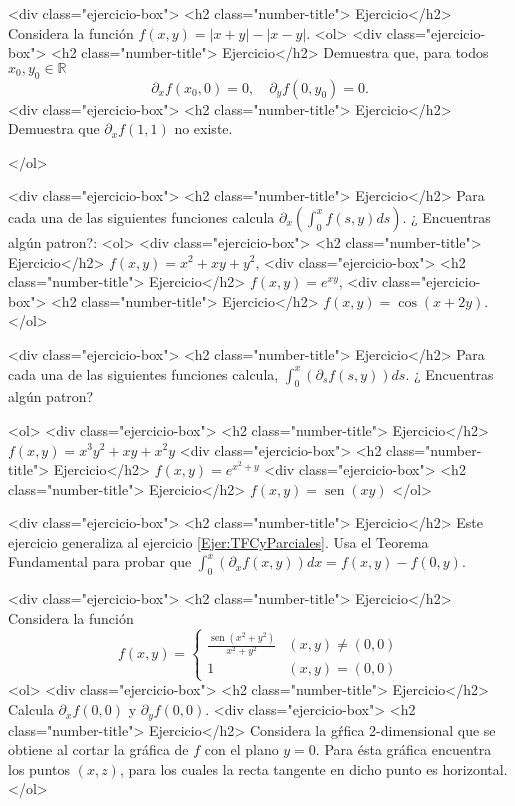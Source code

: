 \documentclass{article}
\theoremstyle{definition}
\newcommand{\sen}{\operatorname{sen}}
\begin{document}
       

     <div class="ejercicio-box"> <h2 class="number-title"> Ejercicio</h2> Considera la función $f(x,y)=|x+y|-|x-y|$.
       <ol>
       <div class="ejercicio-box"> <h2 class="number-title"> Ejercicio</h2> Demuestra que, para todos $x_0,y_0\in \mathbb{R}$
         $$
         \partial_xf(x_0,0)=0, \quad \partial_yf(0,y_0)=0.
         $$
       <div class="ejercicio-box"> <h2 class="number-title"> Ejercicio</h2> Demuestra que $\partial_xf(1,1)$ no existe.
         
       </ol>


              
     <div class="ejercicio-box"> <h2 class="number-title"> Ejercicio</h2> Para cada una de las siguientes funciones calcula $\partial_x\left( \int_0^x f(s,y)ds \right)$. ¿ Encuentras algún patron?:
       <ol>
       <div class="ejercicio-box"> <h2 class="number-title"> Ejercicio</h2> $f(x,y)=x^2+xy+y^2$,
       <div class="ejercicio-box"> <h2 class="number-title"> Ejercicio</h2> $f(x,y)=e^{xy}$,
       <div class="ejercicio-box"> <h2 class="number-title"> Ejercicio</h2> $f(x,y)=\cos(x+2y)$.
       </ol>
       
     <div class="ejercicio-box"> <h2 class="number-title"> Ejercicio</h2>\label{Ejer:TFCyParciales} Para cada una de las siguientes funciones calcula,  $\int_0^x(\partial_s f(s,y))ds$.
      ¿ Encuentras algún patron?

       <ol>
       <div class="ejercicio-box"> <h2 class="number-title"> Ejercicio</h2> $f(x,y)=x^3y^2+xy+x^2y$
       <div class="ejercicio-box"> <h2 class="number-title"> Ejercicio</h2> $f(x,y)=e^{x^2+y}$
       <div class="ejercicio-box"> <h2 class="number-title"> Ejercicio</h2> $f(x,y)=\sen(xy)$
       </ol>

       
      
     <div class="ejercicio-box"> <h2 class="number-title"> Ejercicio</h2> Este ejercicio generaliza al ejercicio \ref{Ejer:TFCyParciales}. Usa el Teorema Fundamental para probar
       que $\int_0^x(\partial_x f(x,y))dx=f(x,y)-f(0,y)$.
      
       
       

   
     <div class="ejercicio-box"> <h2 class="number-title"> Ejercicio</h2> Considera la función
       $$
       f(x,y)=\left\{
         \begin{array}{cc}
           \frac{\sen(x^2+y^2)}{x^2+y^2} & (x,y)\ne (0,0) \\
           1 & (x,y)=(0,0)
         \end{array}
         \right.
         $$
         <ol>
         <div class="ejercicio-box"> <h2 class="number-title"> Ejercicio</h2> Calcula $\partial_xf(0,0)$ y $\partial_yf(0,0)$.
         <div class="ejercicio-box"> <h2 class="number-title"> Ejercicio</h2> Considera la g\'rfica 2-dimensional que se obtiene al cortar
           la gráfica de $f$ con el plano $y=0$. Para ésta gráfica encuentra
           los puntos $(x,z)$,  para los cuales la recta tangente en dicho punto es horizontal.
         </ol>    
   
\end{document}
